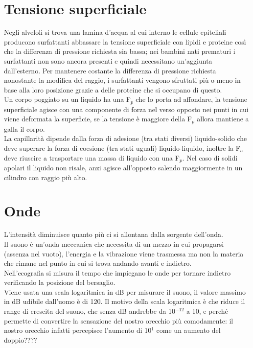 \documentclass[10pt]{article}
\begin{document}
\section*{Tensione superficiale}
Negli alveloli si trova una lamina d'acqua al cui interno le cellule epiteliali producono surfattanti abbassare la tensione superficiale con lipidi e proteine così che la differenza di pressione richiesta sia bassa; nei bambini nati prematuri i surfattanti non sono ancora presenti e quindi necessitano un'aggiunta dall'esterno. Per mantenere costante la differenza di pressione richiesta nonostante la modifica del raggio, i surfattanti vengono sfruttati più o meno in base alla loro posizione grazie a delle proteine che si occupano di questo.\\
Un corpo poggiato su un liquido ha una F$_p$ che lo porta ad affondare, la tensione superficiale agisce con una componente di forza nel verso opposto nei punti in cui viene deformata la superficie, se la tensione è maggiore della F$_p$ allora mantiene a galla il corpo.\\
La capillarità dipende dalla forza di adesione (tra stati diversi) liquido-solido che deve superare la forza di coesione (tra stati uguali) liquido-liquido, inoltre la F$_a$ deve riuscire a trasportare una massa di liquido con una F$_p$. Nel caso di solidi apolari il liquido non risale, anzi agisce all'opposto salendo maggiormente in un cilindro con raggio più alto.
\section*{Onde}
L'intensità diminuisce quanto più ci si allontana dalla sorgente dell'onda.\\
Il suono è un'onda meccanica che necessita di un mezzo in cui propagarsi (assenza nel vuoto), l'energia e la vibrazione viene trasmessa ma non la materia che rimane nel punto in cui si trova andando avanti e indietro.\\
Nell'ecografia si misura il tempo che impiegano le onde per tornare indietro verificando la posizione del bersaglio.\\
Viene usata una scala logaritmica in dB per misurare il suono, il valore massimo in dB udibile dall'uomo è di 120. Il motivo della scala logaritmica è che riduce il range di crescita del suono, che senza dB andrebbe da 10$^{-12}$ a 10, e perché permette di convertire la sensazione del nostro orecchio più comodamente: il nostro orecchio infatti percepisce l'aumento di 10$^1$ come un aumento del doppio????
\end{document}
